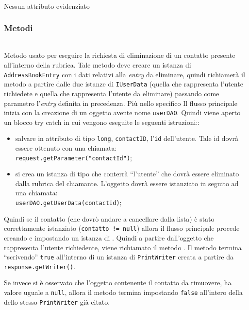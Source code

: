 Nessun attributo evidenziato

\subsubsection*{Metodi}
\begin{description}
	\item{}\\	
	Metodo usato per eseguire la richiesta di eliminazione di un contatto presente all'interno della rubrica. Tale metodo deve creare un istanza di \texttt{AddressBookEntry} con i dati relativi alla \textit{entry} da eliminare, quindi richiamerà il metodo  a partire dalle due istanze di \texttt{IUserData} (quella che rappresenta l'utente richiedete e quella che rappresenta l'utente da eliminare) passando come parametro l'\textit{entry} definita in precedenza. Più nello specifico Il flusso principale inizia  con la creazione di un oggetto  avente nome \texttt{userDAO}. Quindi viene aperto un blocco try catch in cui vengono eseguite le seguenti istruzioni::
	\begin{itemize}
		\item salvare in attributo di tipo \texttt{long}, \texttt{contactID}, l'\texttt{id} dell'utente. Tale id dovrà essere ottenuto con una chiamata:\\
		\verb|request.getParameter("contactId")|;\\
		
		\item si crea un istanza di tipo  che conterrà ``l'utente'' che dovrà essere eliminato dalla rubrica del chiamante. L'oggetto dovrà essere istanziato in seguito ad una chiamata:\\
		\verb|userDAO.getUserData(contactId)|;
	\end{itemize}
	Quindi se il contatto (che dovrò andare a cancellare dalla lista) è stato correttamente istanziato (\texttt{contatto != null}) allora il flusso principale procede creando e impostando un istanza di . Quindi a partire dall'oggetto che rappresenta l'utente richiedente, viene richiamato il metodo . Il metodo termina ``scrivendo'' \texttt{true} all'interno di un istanza di \texttt{PrintWriter} creata a partire da \texttt{response.getWriter()}.
	
	Se invece si è osservato che l'oggetto contenente il contatto da rimuovere, ha valore uguale a \texttt{null}, allora il metodo termina impostando \texttt{false} all'intero della dello stesso \texttt{PrintWriter} già citato.
\end{description}

